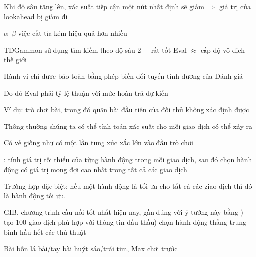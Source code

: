 \documentclass{article}
\begin{document}
\begin{huge}
Khi độ sâu tăng lên, xác suất tiếp cận một nút nhất định sẽ giảm \nl
$\Rightarrow$ giá trị của lookahead bị giảm đi

$\alpha$--$\beta$ việc cắt tỉa kém hiệu quả hơn nhiều

{\sc TDGammon} sử dụng tìm kiếm theo độ sâu 2 + rất tốt {\sc Eval}\nl
$\approx$ cấp độ vô địch thế giới



\vspace*{0.3in}

\textwidth
{}


Hành vi chỉ được bảo toàn bằng phép biến đổi tuyến tính dương  của
{\sc Đánh giá}

Do đó {\sc Eval} phải tỷ lệ thuận với mức hoàn trả dự kiến



Ví dụ: trò chơi bài, trong đó quân bài đầu tiên của đối thủ không xác định được

Thông thường chúng ta có thể tính toán xác suất cho mỗi giao dịch có thể xảy ra

Có vẻ giống như có một lần tung xúc xắc lớn vào đầu trò chơi\mat{$^*$}

: tính giá trị tối thiểu của từng hành động trong mỗi giao dịch,\nl
   sau đó chọn hành động có giá trị mong đợi cao nhất trong tất cả các giao dịch\mat{$^*$}

Trường hợp đặc biệt: nếu một hành động là tối ưu cho tất cả các giao dịch thì đó là hành động tối ưu.\mat{$^*$}

GIB, chương trình cầu nối tốt nhất hiện nay, gần đúng với ý tưởng này bằng ) tạo 100 giao dịch phù hợp với thông tin đấu thầu) chọn hành động thắng trung bình hầu hết các thủ thuật 



Bài bốn lá bài/tay bài huýt sáo/trái tim, {\sc Max} chơi trước

\vspace*{0.1in}

\textwidth
{}



\end{huge}
\end{document}
